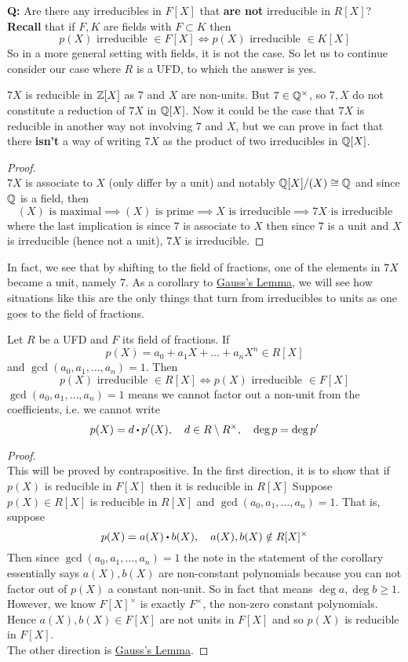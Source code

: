 \documentclass[../Main.tex]{subfiles}
\begin{document}
\textbf{Q:} Are there any irreducibles in $F[X]$ that \textbf{are not} irreducible in $R[X]$?\\
\textbf{Recall} that if $F,K$ are fields with $F\subset K$ then \[p(X) \text{ irreducible } \in F[X] \Longleftrightarrow p(X) \text{ irreducible }\in K[X]\]
So in a more general setting with fields, it is not the case. So let us to continue consider our case where $R$ is a UFD, to which the answer is yes.
\begin{example}
	$7X$ is reducible in $\mathbb{Z}[X]$ as $7$ and $X$ are non-units. But $7\in \mathbb{Q}^\times$, so $7,X$ do not constitute a reduction of $7X$ in $\mathbb{Q}[X]$. Now it could be the case that $7X$ is reducible in another way not involving $7$ and $X$, but we can prove in fact that there \textbf{isn't} a way of writing $7X$ as the product of two irreducibles in $\mathbb{Q}[X]$.
	\begin{proof}~\\ $7X$ is associate to $X$ (only differ by a unit) and notably $\mathbb{Q}[X]/(X)\cong \mathbb{Q}$ and since $\mathbb{Q}$ is a field, then
	\[ (X) \text{ is maximal}\implies (X) \text{ is prime}\implies X\text{ is irreducible}\implies 7X\text{ is irreducible}\]
	where the last implication is since $7$ is associate to $X$ then since $7$ is a unit and $X$ is irreducible (hence not a unit), $7X$ is irreducible.
	\end{proof}
\end{example}
In fact, we see that by shifting to the field of fractions, one of the elements in $7X$ became a unit, namely $7$. As a corollary to \hyperref[lem:gauss]{Gauss's Lemma}, we will see how situations like this are the only things that turn from irreducibles to units as one goes to the field of fractions. 
\begin{crl}[label=13.2]
	Let $R$ be a UFD and $F$ its field of fractions. If
	\[p(X)=a_0+a_1X+\dots+a_nX^n \in R[X]\]
	and $\gcd(a_0,a_1,\dots,a_n)=1$. Then
	\[p(X) \text{ irreducible }\in R[X] \Longleftrightarrow p(X) \text{ irreducible }\in F[X]\]
	\Note $\gcd(a_0,a_1,\dots,a_n)=1$ means we cannot factor out a non-unit from the coefficients, i.e. we cannot write
	\[p(X)=d\rdot p'(X),\quad d\in R\setminus R^\times, \quad \deg p =\deg p'\] 
\end{crl}
\begin{proof}~\\
	This will be proved by contrapositive. In the first direction, it is to show that if $p(X)$ is reducible in $F[X]$ then it is reducible in $R[X]$
	Suppose $p(X)\in R[X]$ is reducible in $R[X]$ and $\gcd(a_0,a_1,\dots,a_n)=1$. That is, suppose
	\[p(X)=a(X)\rdot b(X),\quad a(X), b(X) \notin R[X]^\times \]
	Then since
	$\gcd(a_0,a_1,\dots,a_n)=1$ the note in the statement of the corollary essentially says $a(X),b(X)$ are non-constant polynomials because you can not factor out of $p(X)$ a constant non-unit. So in fact that means $\deg a, \deg b\ge 1$.\\
	However, we know $F[X]^\times$ is exactly $F^\times$, the non-zero constant polynomials. Hence $a(X),b(X)\in F[X]$ are not units in $F[X]$ and so $p(X)$ is reducible in $F[X]$.\\
	The other direction is \hyperref[lem:gauss]{Gauss's Lemma}.
\end{proof}
\end{document}
